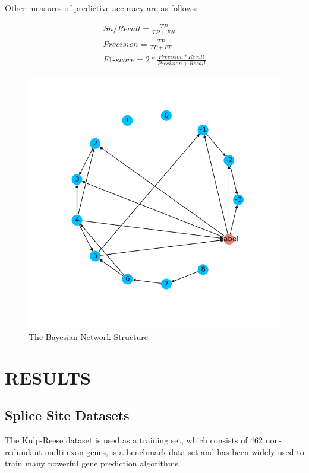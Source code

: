 \documentclass{gapd}
\begin{document}
Other measures of predictive accuracy are as follows:

\begin{gather*}%
  Sn/Recall = \frac{TP}{TP+FN} \\
  Precision = \frac{TP}{TP+FP} \\
  F1\text{-}score =2* \frac{Precision*Recall}{Precision+Recall}
\end{gather*}


\begin{figure}
  \centering
  \includegraphics[width=\columnwidth]{assets/network-20210609212835-4n4fayy.png}
  \caption{The Bayesian Network Structure}
  \label{fig:network}
\end{figure}  

\section{RESULTS}\label{results}

\subsection{Splice Site Datasets}\label{splice-site-datasets}

The Kulp-Reese dataset is used as a training set, which consists of
462 non-redundant multi-exon genes, is a benchmark data set and has been
widely used to train many powerful gene prediction algorithms.
\end{document}
